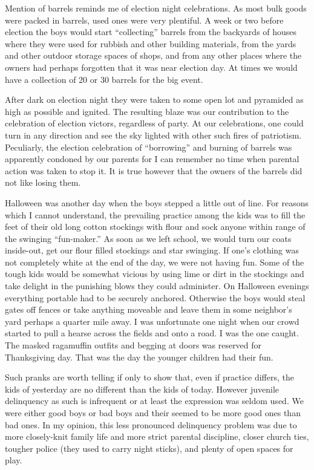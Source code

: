 \documentclass[12pt]{book}              %
\begin{document}
Mention of barrels reminds me of election night celebrations. As most bulk goods were packed in barrels, used ones were very plentiful. A week or two before election the boys would start ``collecting'' barrels from the backyards of houses where they were used for rubbish and other building materials, from the yards and other outdoor storage spaces of shops, and from any other places where the owners had perhaps forgotten that it was near election day. At times we would have a collection of 20 or 30 barrels for the big event.

After dark on election night they were taken to some open lot and pyramided as high as possible and ignited. The resulting blaze was our contribution to the celebration of election victors, regardless of party. At our celebrations, one could turn in any direction and see the sky lighted with other such fires of patriotism. Peculiarly, the election celebration of ``borrowing'' and burning of barrels was apparently condoned by our parents for I can remember no time when parental action was taken to stop it. It is true however that the owners of the barrels did not like losing them.

Halloween was another day when the boys stepped a little out of line. For reasons which I cannot understand, the prevailing practice among the kids was to fill the feet of their old long cotton stockings with flour and sock anyone within range of the swinging ``fun-maker.'' As soon as we left school, we would turn our coats inside-out, get our flour filled stockings and star swinging. If one's clothing was not completely white at the end of the day, we were not having fun. Some of the tough kids would be somewhat vicious by using lime or dirt in the stockings and take delight in the punishing blows they could administer. On Halloween evenings everything portable had to be securely anchored. Otherwise the boys would steal gates off fences or take anything moveable and leave them in some neighbor's yard perhaps a quarter mile away. I was unfortunate one night when our crowd started to pull a hearse across the fields and onto a road. I was the one caught. The masked ragamuffin outfits and begging at doors was reserved for Thanksgiving day. That was the day the younger children had their fun.

Such pranks are worth telling if only to show that, even if practice differs, the kids of yesterday are no different than the kids of today. However juvenile delinquency as such is infrequent or at least the expression was seldom used. We were either good boys or bad boys and their seemed to be more good ones than bad ones. In my opinion, this less pronounced delinquency problem was due to more closely-knit family life and more strict parental discipline, closer church ties, tougher police (they used to carry night sticks), and plenty of open spaces for play.
\end{document}

